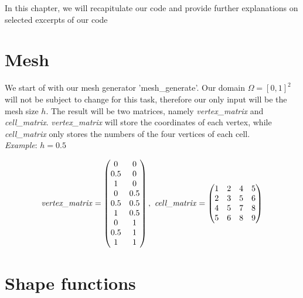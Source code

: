 In this chapter, we will recapitulate our code and provide further explanations on selected excerpts of our code

\section{Mesh}

We start of with our mesh generator 'mesh\_generate'. Our domain $\Omega = [0,1]^2$ will not be subject to change for this task, therefore our only input will be the mesh size $h$. The result will be two matrices, namely \textit{vertex\_matrix} and \textit{cell\_matrix}. \textit{vertex\_matrix} will store the coordinates of each vertex, while \textit{cell\_matrix} only stores the numbers of the four vertices of each cell.
\\
\textit{Example}: $h=0.5$

\[\mbox{\textit{vertex\_matrix}}=\begin{pmatrix} 0&0\\0.5&0\\1&0\\0&0.5\\0.5&0.5\\1&0.5\\0&1\\0.5&1\\1&1\\\end{pmatrix},\ \mbox{\textit{cell\_matrix}}=\begin{pmatrix} 1&2&4&5\\2&3&5&6\\4&5&7&8\\5&6&8&9\\
\end{pmatrix}\]

\section{Shape functions}

